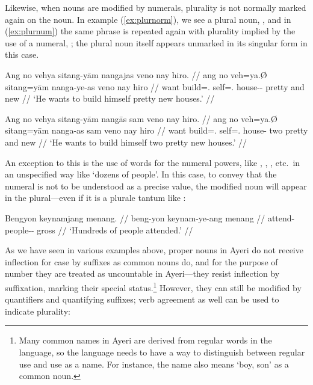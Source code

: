 \xe

Likewise, when nouns are modified by numerals, plurality is not
normally marked again on the noun. In example (\ref{ex:plurnorm}), we see a
plural noun, , and in (\ref{ex:plurnum}) the same phrase
is repeated again with plurality implied by the use of a numeral,
; the plural noun itself appears unmarked in its singular 
form in this case.

\pex
\a\label{ex:plurnorm}\begingl
	\gla Ang no vehya sitang-yām nangajas veno nay hiro. //
	\glb ang no veh=ya.Ø sitang=yām nanga-ye-as veno nay hiro //
	\glc \AgtT{} want build=\TsgM.\Top{} self=\TsgM{}.\Dat{} 
		house-\Pl{}-\Parg{} pretty and new //
	\glft `He wants to build himself pretty new houses.' //
\endgl

\a\label{ex:plurnum}\begingl
	\gla Ang no vehya sitang-yām nangās sam veno nay hiro. //
	\glb ang no veh=ya.Ø sitang=yām nanga-as sam veno nay hiro //
	\glc \AgtT{} want build=\TsgM.\Top{} self=\TsgM{}.\Dat{} house-\Parg{} 
		two pretty and new //
	\glft `He wants to build himself two pretty new houses.' //
\endgl

\xe

An exception to this is the use of words for the numeral powers, like
, ,
, etc.\ in an unspecified way like `dozens 
of people'. In this case, to convey that the numeral is not to be understood as
a precise value, the modified noun will appear in the plural---even if it is a
plurale tantum like :

\ex\begingl
	\gla Bengyon keynamjang menang. //
	\glb beng-yon keynam-ye-ang menang //
	\glc attend-\TsgN{} people-\Pl{}-\Aarg{} gross //
	\glft `Hundreds of people attended.' //
\endgl\xe

%
As we have seen in various examples above, proper nouns in Ayeri do not 
receive inflection for case by suffixes as common nouns do, and for the 
purpose of number they are treated as uncountable in Ayeri---they resist 
inflection by suffixation, marking their special status.\footnote{Many common 
names in Ayeri are derived from regular words in the language, so the language 
needs to have a way to distinguish between regular use and use as a name. For 
instance, the name  also means `boy, son' as a common noun.} 
However, they can still be modified by quantifiers and quantifying suffixes; 
verb agreement as well can be used to indicate plurality:

